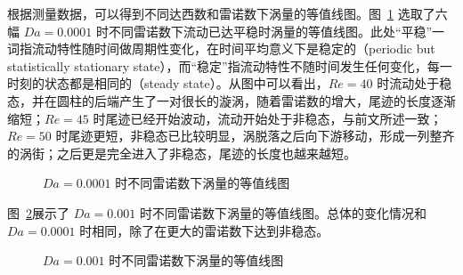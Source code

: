 根据测量数据，可以得到不同达西数和雷诺数下涡量的等值线图。图~\ref{fig: vorticity-contour-1e-4} 选取了六幅 $Da=0.0001$ 时不同雷诺数下流动已达平稳时涡量的等值线图。此处“平稳”一词指流动特性随时间做周期性变化，在时间平均意义下是稳定的（periodic but statistically stationary state），而“稳定”指流动特性不随时间发生任何变化，每一时刻的状态都是相同的（steady state）。从图中可以看出，$Re=40$ 时流动处于稳态，并在圆柱的后端产生了一对很长的漩涡，随着雷诺数的增大，尾迹的长度逐渐缩短；$Re=45$ 时尾迹已经开始波动，流动开始处于非稳态，与前文所述一致；$Re=50$ 时尾迹更短，非稳态已比较明显，涡脱落之后向下游移动，形成一列整齐的涡街；之后更是完全进入了非稳态，尾迹的长度也越来越短。

\begin{figure}
	\centering
	\begin{minipage}{\textwidth}
		\centering
	\end{minipage}
	\centering
	\begin{minipage}{\textwidth}
		\centering
	\end{minipage}
	\centering
	\begin{minipage}{\textwidth}
		\centering
	\end{minipage}
	\caption{$Da=0.0001$ 时不同雷诺数下涡量的等值线图}
	\label{fig: vorticity-contour-1e-4}
\end{figure}

图~\ref{fig: vorticity-contour-1e-3}展示了 $Da=0.001$ 时不同雷诺数下涡量的等值线图。总体的变化情况和 $Da=0.0001$ 时相同，除了在更大的雷诺数下达到非稳态。

\begin{figure}
	\centering
	\begin{minipage}{\textwidth}
		\centering
	\end{minipage}
	\centering
	\begin{minipage}{\textwidth}
		\centering
	\end{minipage}
	\centering
	\begin{minipage}{\textwidth}
		\centering
	\end{minipage}
	\caption{$Da=0.001$ 时不同雷诺数下涡量的等值线图}
	\label{fig: vorticity-contour-1e-3}
\end{figure}

